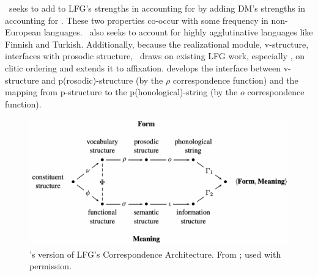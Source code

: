 \documentclass[output=paper,hidelinks]{langscibook}
\begin{document}
\lrfg\ seeks to add to LFG's strengths in accounting for
  by adding DM's strengths in accounting
for . These two properties co-occur with some
frequency in non-European languages. \lrfg\ also seeks to account for
highly agglutinative languages like Finnish and Turkish.
Additionally, because the realizational module, v-structure,
interfaces with prosodic structure, \lrfg\ draws on existing LFG work,
especially \citet{Boegel2015}, on clitic ordering and extends it to
affixation. \citet{asudeh;bogel;siddiqi-momot} develops the interface
between v-structure and p(rosodic)-structure (by the $\rho$
correspondence function) and the mapping from p-structure to the
p(honological)-string (by the $o$ correspondence function). 

  
\begin{figure}[htb]
  \centering
  \includegraphics[scale=.55]{figures/Morphology/lrfg-corrarch.png}
  \caption{\lrfg's version of LFG's Correspondence Architecture. From
    \citet[271]{Melchin2020}; used with permission.}
  \label{fig:lrfg-corrarch}
 \end{figure}
 
\end{document}
